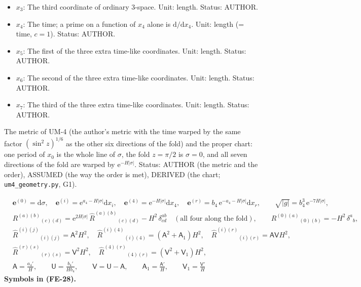 \documentclass[
  10pt,
]{article}
\begin{document}
\begin{itemize}
  Status: AUTHOR.
\item
  \(x_3\): The third coordinate of ordinary 3-space. Unit: length.
  Status: AUTHOR.
\item
  \(x_4\): The time; a prime on a function of \(x_4\) alone is
  \(\mathrm{d}/\mathrm{d}x_4\). Unit: length (= time, \(c = 1\)).
  Status: AUTHOR.
\item
  \(x_5\): The first of the three extra time-like coordinates. Unit:
  length. Status: AUTHOR.
\item
  \(x_6\): The second of the three extra time-like coordinates. Unit:
  length. Status: AUTHOR.
\item
  \(x_7\): The third of the three extra time-like coordinates. Unit:
  length. Status: AUTHOR.
\end{itemize}

The metric of UM-4 (the author's metric with the time warped by the same
factor \((\sin^2z)^{1/6}\) as the other six directions of the fold) and
the proper chart: one period of \(x_0\) is the whole line of \(\sigma\),
the fold \(z = \pi/2\) is \(\sigma = 0\), and all seven directions of
the fold are warped by \(\mathrm{e}^{-H\lvert\sigma\rvert}\). Status:
AUTHOR (the metric and the order), ASSUMED (the way the order is met),
DERIVED (the chart; \texttt{um4\_geometry.py}, G1).

\[
\begin{aligned}
&\mathbf{e}^{(0)} = \mathrm{d}\sigma,\quad \mathbf{e}^{(i)} = \mathrm{e}^{a_4 - H\lvert\sigma\rvert}\mathrm{d}x_i,\quad
 \mathbf{e}^{(4)} = \mathrm{e}^{-H\lvert\sigma\rvert}\mathrm{d}x_4,\quad \mathbf{e}^{(r)} = b_4\,\mathrm{e}^{-a_4 - H\lvert\sigma\rvert}\mathrm{d}x_r,\qquad
 \sqrt{\lvert g\rvert} = b_4^3\,\mathrm{e}^{-7H\lvert\sigma\rvert},\\
&R^{(a)(b)}{}_{(c)(d)} = \mathrm{e}^{2H\lvert\sigma\rvert}\,\hat R^{(a)(b)}{}_{(c)(d)} - H^2\,\delta^{ab}_{cd}\quad(\text{all four along the fold}),\qquad
 R^{(0)(a)}{}_{(0)(b)} = -H^2\,\delta^a{}_b,\\
&\hat R^{(i)(j)}{}_{(i)(j)} = \mathsf{A}^2H^2,\quad \hat R^{(i)(4)}{}_{(i)(4)} = (\mathsf{A}^2 + \mathsf{A}_1)H^2,\quad
 \hat R^{(i)(r)}{}_{(i)(r)} = \mathsf{A}\mathsf{V}H^2,\\
&\hat R^{(r)(s)}{}_{(r)(s)} = \mathsf{V}^2H^2,\quad
 \hat R^{(4)(r)}{}_{(4)(r)} = (\mathsf{V}^2 + \mathsf{V}_1)H^2,\\
&\mathsf{A} = \frac{a_4'}{H},\qquad \mathsf{U} = \frac{b_4'}{Hb_4},\qquad \mathsf{V} = \mathsf{U} - \mathsf{A},\qquad
 \mathsf{A}_1 = \frac{\mathsf{A}'}{H},\qquad \mathsf{V}_1 = \frac{\mathsf{V}'}{H}
\end{aligned} \tag{FE-28}
\] \textbf{Symbols in (FE-28).}
\end{document}
